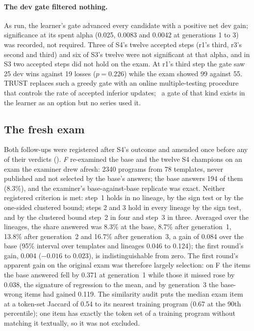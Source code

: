 \paragraph{The dev gate filtered nothing.} As run, the learner's gate advanced every candidate with a
positive net dev gain; significance at its spent alpha (0.025, 0.0083 and 0.0042 at generations 1 to 3)
was recorded, not required. Three of S4's twelve accepted steps (r1's third, r3's second and third) and
six of S3's twelve were not significant at that alpha, and in S3 two accepted steps did not hold on the
exam. At r1's third step the gate saw 25 dev wins against 19 losses ($p=0.226$) while the exam
showed 99 against 55. TRUST replaces such a greedy gate with an online multiple-testing procedure that
controls the rate of accepted inferior updates;~\citep{trust2026} a gate of that kind exists in
the learner as an option but no series used it.

\subsection{The fresh exam}\label{sec:followups}

Both follow-ups were registered after S4's outcome and amended once before any of their verdicts
(). \emph{F} re-examined the base and the twelve S4
champions on an exam the examiner drew afresh: 2340 programs from 78 templates, never published and not
selected by the base's answers; the base answers 194 of them (8.3\%), and the examiner's base-against-base
replicate was exact. Neither registered criterion is met: step~1 holds in no lineage, by the sign
test or by the one-sided clustered bound; steps 2 and 3 hold in every lineage by the sign test, and by
the clustered bound step~2 in four and step~3 in three. Averaged over the lineages, the
share answered was 8.3\% at the base, 8.7\% after generation~1, 13.8\% after generation~2 and 16.7\%
after generation~3, a gain of 0.084 over the base (95\% interval over templates and lineages 0.046 to
0.124); the first round's gain, 0.004 ($-0.016$ to 0.023), is indistinguishable from
zero. The first round's apparent gain on the original exam was therefore largely selection:
on F the items the base answered fell by 0.371 at generation~1 while those it missed rose by 0.038,
the signature of regression to the mean, and by generation~3 the base-wrong items had gained
0.119. The similarity audit puts the median exam item at a token-set Jaccard of 0.54 to its
nearest training program (0.67 at the 90th percentile); one item has exactly the token set of a training
program without matching it textually, so it was not excluded.

